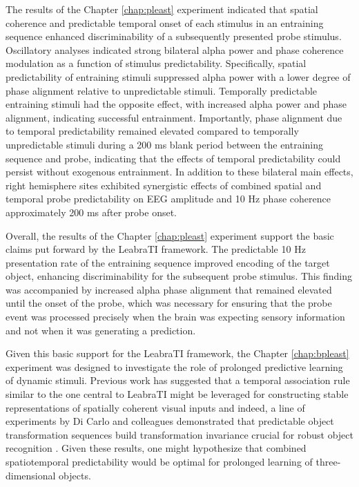 \documentclass[dwyatte_dissertation.tex]{subfiles}
\begin{document}
The results of the Chapter \ref{chap:pleast} experiment indicated that spatial coherence and predictable temporal onset of each stimulus in an entraining sequence enhanced discriminability of a subsequently presented probe stimulus. Oscillatory analyses indicated strong bilateral alpha power and phase coherence modulation as a function of stimulus predictability. Specifically, spatial predictability of entraining stimuli suppressed alpha power with a lower degree of phase alignment relative to unpredictable stimuli. Temporally predictable entraining stimuli had the opposite effect, with increased alpha power and phase alignment, indicating successful entrainment. Importantly, phase alignment due to temporal predictability remained elevated compared to temporally unpredictable stimuli during a 200 ms blank period between the entraining sequence and probe, indicating that the effects of temporal predictability could persist without exogenous entrainment. In addition to these bilateral main effects, right hemisphere sites exhibited synergistic effects of combined spatial and temporal probe predictability on EEG amplitude and 10 Hz phase coherence approximately 200 ms after probe onset. 

Overall, the results of the Chapter \ref{chap:pleast} experiment support the basic claims put forward by the LeabraTI framework. The predictable 10 Hz presentation rate of the entraining sequence improved encoding of the target object, enhancing discriminability for the subsequent probe stimulus. This finding was accompanied by increased alpha phase alignment that remained elevated until the onset of the probe, which was necessary for ensuring that the probe event was processed precisely when the brain was expecting sensory information and not when it was generating a prediction. 

Given this basic support for the LeabraTI framework, the Chapter \ref{chap:bpleast} experiment was designed to investigate the role of prolonged predictive learning of dynamic stimuli. Previous work has suggested that a temporal association rule similar to the one central to LeabraTI might be leveraged for constructing stable representations of spatially coherent visual inputs \cite{StringerPerryRollsEtAl06,WallisBaddeley97,IsikLeiboPoggio12} and indeed, a line of experiments by Di Carlo and colleagues demonstrated that predictable object transformation sequences build transformation invariance crucial for robust object recognition \cite{CoxMeierOerteltEtAl05,LiDiCarlo08,LiDiCarlo10,LiDiCarlo12}. Given these results, one might hypothesize that combined spatiotemporal predictability would be optimal for prolonged learning of three-dimensional objects. 
\end{document}
